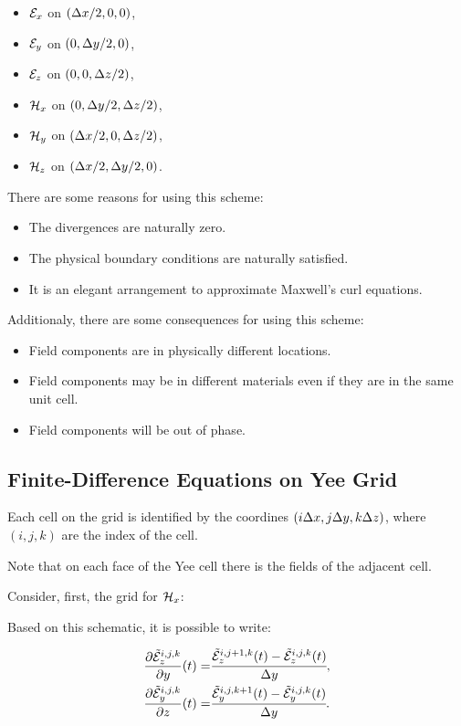 \begin{itemize}
    \item $\mathcal{E}_x$ on $(\Delta x/2, 0, 0)$,
    \item $\mathcal{E}_y$ on $(0, \Delta y/2, 0)$,
    \item $\mathcal{E}_z$ on $(0, 0, \Delta z/2)$,
    \item $\mathcal{H}_x$ on $(0, \Delta y/2, \Delta z/2)$,
    \item $\mathcal{H}_y$ on $(\Delta x/2, 0, \Delta z/2)$,
    \item $\mathcal{H}_z$ on $(\Delta x/2, \Delta y/2, 0)$.
\end{itemize}

There are some reasons for using this scheme:
\begin{itemize}
    \item The divergences are naturally zero.
    \item The physical boundary conditions are naturally satisfied.
    \item It is an elegant arrangement to approximate Maxwell's curl equations.
\end{itemize}

Additionaly, there are some consequences for using this scheme:
\begin{itemize}
    \item Field components are in physically different locations.
    \item Field components may be in different materials even if they are in the same unit cell.
    \item Field components will be out of phase.
\end{itemize}

\subsection{Finite-Difference Equations on Yee Grid}

Each cell on the grid is identified by the coordines $(i\Delta x, j\Delta y, k\Delta z)$, where $(i, j, k)$ are the index of the cell.

Note that on each face of the Yee cell there is the fields of the adjacent cell.

Consider, first, the grid for $\mathcal{H}_x$:



Based on this schematic, it is possible to write:

\begin{eqnarray}
    \frac{\partial \tilde{\mathcal{E}}_z^{i,j,k}}{\partial y}(t) =& \cfrac{\tilde{\mathcal{E}}_z^{i, j+1, k}(t)-\tilde{\mathcal{E}}_z^{i, j, k}(t)}{\Delta y}, \\
    \frac{\partial \tilde{\mathcal{E}}_y^{i,j,k}}{\partial z}(t) =& \cfrac{\tilde{\mathcal{E}}_y^{i, j, k+1}(t)-\tilde{\mathcal{E}}_y^{i, j, k}(t)}{\Delta y}.
\end{eqnarray}

